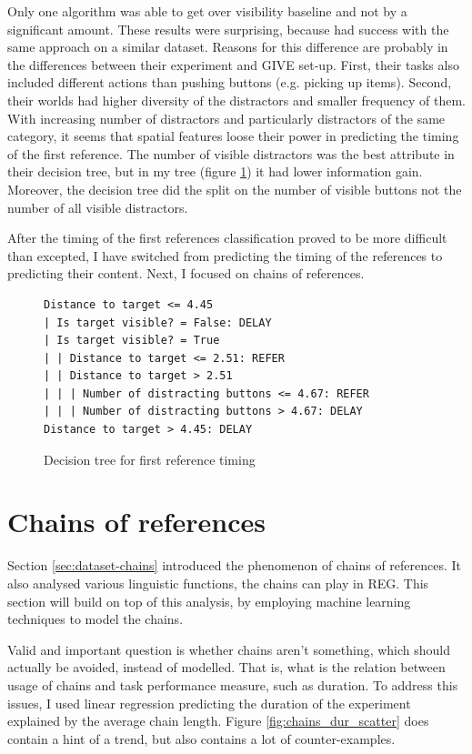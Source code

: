 Only one algorithm was able to get over visibility baseline and not by a significant amount. These results were surprising, because \citet{stoia2006sentence} had success with the same approach on a similar dataset. Reasons for this difference are probably in the differences between their experiment and GIVE set-up. First, their tasks also included different actions than pushing buttons (e.g. picking up items). Second, their worlds had higher diversity of the distractors and smaller frequency of them. With increasing number of distractors and particularly distractors of the same category, it seems that spatial features loose their power in predicting the timing of the first reference. The number of visible distractors was the best attribute in their decision tree, but in my tree (figure \ref{fig:dectree}) it had lower information gain. Moreover, the decision tree did the split on the number of visible buttons not the number of all visible distractors.

After the timing of the first references classification proved to be more difficult than excepted, I have switched from predicting the timing of the references to predicting their content. Next, I focused on chains of references.

\begin{figure}[!htbp]
 \centering
\small
\begin{verbatim}
Distance to target <= 4.45
| Is target visible? = False: DELAY
| Is target visible? = True
| | Distance to target <= 2.51: REFER
| | Distance to target > 2.51
| | | Number of distracting buttons <= 4.67: REFER
| | | Number of distracting buttons > 4.67: DELAY
Distance to target > 4.45: DELAY
\end{verbatim}
\caption{Decision tree for first reference timing}
\label{fig:dectree}
\end{figure}

\section{Chains of references}
Section \ref{sec:dataset-chains} introduced the phenomenon of chains of references. It also analysed various linguistic functions, the chains can play in REG. This section will build on top of this analysis, by employing machine learning techniques to model the chains.

Valid and important question is whether chains aren't something, which should actually be avoided, instead of modelled. That is, what is the relation between usage of chains and task performance measure, such as duration. To address this issues, I used linear regression predicting the duration of the experiment explained by the average chain length. Figure \ref{fig:chains_dur_scatter} does contain a hint of a trend, but also contains a lot of counter-examples. 

